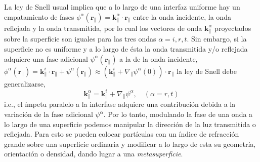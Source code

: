 \documentclass[12pt]{article}
\begin{document}
La ley de Snell usual implica que a lo largo de una interfaz uniforme
hay un empatamiento de fases $\phi^\alpha(\bm r_\|)=\bm k^\alpha_\|\cdot\bm
r_\|$ entre la onda incidente, la onda reflejada y la
onda transmitida, por lo cual los vectores de onda $\bm k^\alpha_\|$
proyectados sobre la superficie son iguales para las tres ondas $\alpha=i,r,t$. Sin
embargo, si la superficie no es uniforme y a lo largo de ésta la onda
transmitida y/o reflejada adquiere una fase adicional $\psi^\alpha(\bm
r_\|)$ a la de la onda incidente, $\phi^\alpha(\bm
r_\|)=\bm k^i_\|\cdot\bm r_\|+\psi^\alpha(\bm r_\|)\approx (\bm
k^i_\|+\nabla_\|\psi^\alpha(0))\cdot\bm r_\|$ la ley de Snell debe
generalizarse,
\begin{equation}
  \label{eq:snell}
  \bm k^\alpha_\|=\bm k^i_\|+\nabla_\|\psi^\alpha,\quad(\alpha=r,t)
\end{equation}
i.e., el ímpetu paralelo a la interfase adquiere una contribución
debida a la variación de la fase adicional $\psi^\alpha$. Por lo
tanto, modulando la fase de una onda a lo largo de una superficie
podemos manipular la dirección de la luz transmitida o reflejada. Para
esto se pueden colocar partículas con un índice de refracción grande
sobre una superficie ordinaria y modificar a lo largo de esta su
geometría, orientación o densidad, dando lugar a una {\em metasuperficie}.
\end{document}
